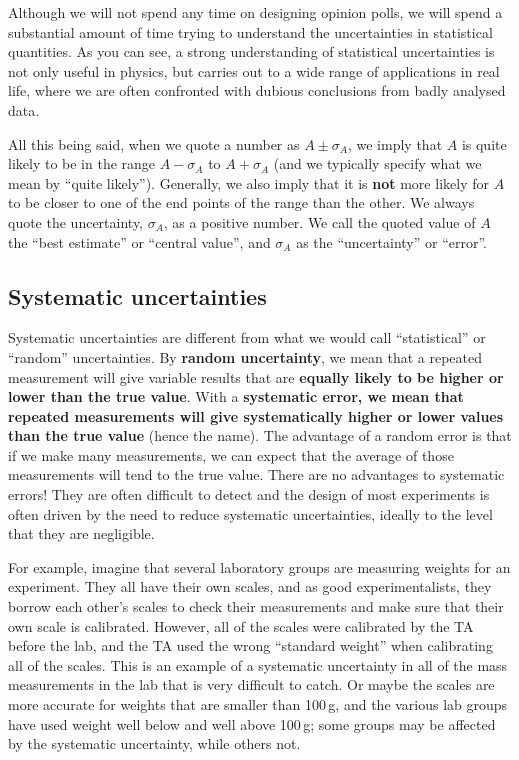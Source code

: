 Although we will not spend any time on designing opinion polls, we will spend a substantial amount of time trying to understand the uncertainties in statistical quantities. As you can see, a strong understanding of statistical uncertainties is not only useful in physics, but carries out to a wide range of applications in real life, where we are often confronted with dubious conclusions from badly analysed data.

All this being said, when we quote a number as $A\pm \sigma_A$, we imply that $A$ is quite likely to be in the range $A-\sigma_A$ to $A+\sigma_A$ (and we typically specify what we mean by ``quite likely''). Generally, we also imply that it is \textbf{not} more likely for $A$ to be closer to one of the end points of the range than the other. We always quote the uncertainty, $\sigma_A$, as a positive number. We call the quoted value of $A$ the ``best estimate'' or ``central value'', and $\sigma_A$ as the ``uncertainty'' or ``error''.

\subsection{Systematic uncertainties}

Systematic uncertainties are different from what we would call ``statistical'' or ``random'' uncertainties. By \textbf{random uncertainty}, we mean that a repeated measurement will give variable results that are \textbf{equally likely to be higher or lower than the true value}. With a \textbf{systematic error, we mean that repeated measurements will give systematically higher or lower values than the true value} (hence the name). The advantage of a random error is that if we make many measurements, we can expect that the average of those measurements will tend to the true value. There are no advantages to systematic errors! They are often difficult to detect and the design of most experiments is often driven by the need to reduce systematic uncertainties, ideally to the level that they are negligible.

For example, imagine that several laboratory groups are measuring weights for an experiment. They all have their own scales, and as good experimentalists, they borrow each other's scales to check their measurements and make sure that their own scale is calibrated. However, all of the scales were calibrated by the TA before the lab, and the TA used the wrong ``standard weight'' when calibrating all of the scales. This is an example of a systematic uncertainty in all of the mass measurements in the lab that is very difficult to catch. Or maybe the scales are more accurate for weights that are smaller than 100\,g, and the various lab groups have used weight well below and well above 100\,g; some groups may be affected by the systematic uncertainty, while others not. 

